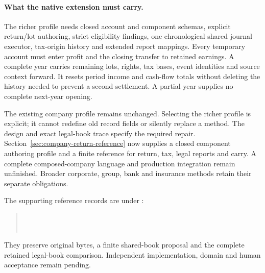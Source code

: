 \paragraph{What the native extension must carry.}
The richer profile needs closed account and component schemas, explicit
return/lot authoring, strict eligibility findings, one chronological shared
journal executor, tax-origin history and extended report mappings. Every
temporary account must enter profit and the closing transfer to retained
earnings. A complete year carries remaining lots, rights, tax bases, event
identities and source context forward. It resets period income and cash-flow
totals without deleting the history needed to prevent a second settlement.
A partial year supplies no complete next-year opening.

The existing company profile remains unchanged. Selecting the richer profile
is explicit; it cannot redefine old record fields or silently replace a
method. The design and exact legal-book trace specify the required repair.
Section~\ref{sec:company-return-reference} now supplies a closed component
authoring profile and a finite reference for return, tax, legal reports and
carry. A complete composed-company language and production integration remain
unfinished. Broader
corporate, group, bank and insurance methods retain their separate obligations.

The supporting reference records are under :
\begin{quote}\small
{}\\
\\
\end{quote}
They preserve original bytes, a finite shared-book proposal and the complete
retained legal-book comparison. Independent implementation, domain and human
acceptance remain pending.


